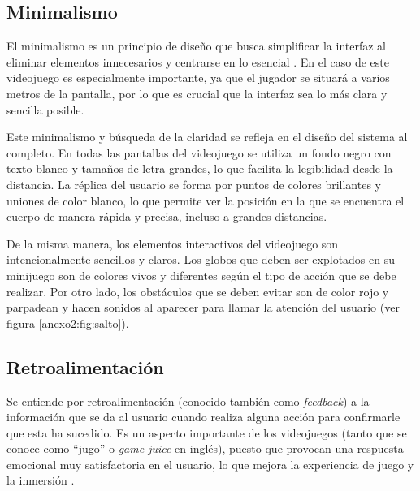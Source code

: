 
\subsection{Minimalismo}
El minimalismo es un principio de diseño que busca simplificar la interfaz al
eliminar elementos innecesarios y centrarse en lo esencial
\parencite{Fessenden2022Feb}.  En el caso de este videojuego es especialmente
importante, ya que el jugador se situará a varios metros de la pantalla, por lo
que es crucial que la interfaz sea lo más clara y sencilla posible.

Este minimalismo y búsqueda de la claridad se refleja en el diseño del sistema
al completo. En todas las pantallas del videojuego se utiliza un fondo negro con
texto blanco y tamaños de letra grandes, lo que facilita la legibilidad desde la
distancia. La réplica del usuario se forma por puntos de colores brillantes y
uniones de color blanco, lo que permite ver la posición en la que se encuentra
el cuerpo de manera rápida y precisa, incluso a grandes distancias.

De la misma manera, los elementos interactivos del videojuego son
intencionalmente sencillos y claros. Los globos que deben ser explotados en su
minijuego son de colores vivos y diferentes según el tipo de acción que se debe
realizar. Por otro lado, los obstáculos que se deben evitar son de color rojo y
parpadean y hacen sonidos al aparecer para llamar la atención del usuario (ver
figura \ref{anexo2:fig:salto}).


\subsection{Retroalimentación}
Se entiende por retroalimentación (conocido también como \textit{feedback}) a la
información que se da al usuario cuando realiza alguna acción para confirmarle
que esta ha sucedido. Es un aspecto importante de los videojuegos (tanto que se
conoce como \enquote{jugo} o \textit{game juice} en inglés), puesto que provocan
una respuesta emocional muy satisfactoria en el usuario, lo que mejora la
experiencia de juego y la inmersión \parencites{Irajdoost2023Nov}{GameJuiceReddit}.

